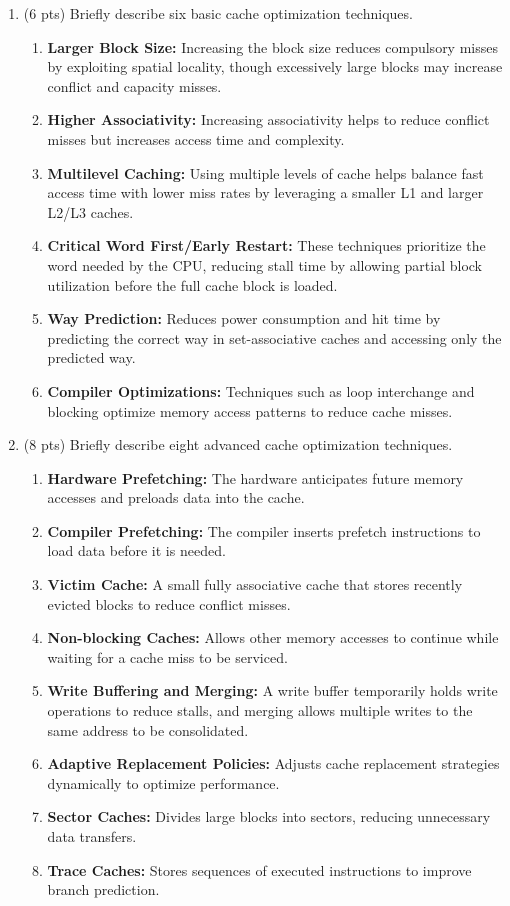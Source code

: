 \begin{enumerate}
    
    \item (6 pts) Briefly describe six basic cache optimization techniques.
    \begin{enumerate}
        \item \textbf{Larger Block Size:} Increasing the block size reduces compulsory misses by exploiting spatial locality, though excessively large blocks may increase conflict and capacity misses.
        \item \textbf{Higher Associativity:} Increasing associativity helps to reduce conflict misses but increases access time and complexity.
        \item \textbf{Multilevel Caching:} Using multiple levels of cache helps balance fast access time with lower miss rates by leveraging a smaller L1 and larger L2/L3 caches.
        \item \textbf{Critical Word First/Early Restart:} These techniques prioritize the word needed by the CPU, reducing stall time by allowing partial block utilization before the full cache block is loaded.
        \item \textbf{Way Prediction:} Reduces power consumption and hit time by predicting the correct way in set-associative caches and accessing only the predicted way.
        \item \textbf{Compiler Optimizations:} Techniques such as loop interchange and blocking optimize memory access patterns to reduce cache misses.
    \end{enumerate}
    
    \item (8 pts) Briefly describe eight advanced cache optimization techniques.
    \begin{enumerate}
        \item \textbf{Hardware Prefetching:} The hardware anticipates future memory accesses and preloads data into the cache.
        \item \textbf{Compiler Prefetching:} The compiler inserts prefetch instructions to load data before it is needed.
        \item \textbf{Victim Cache:} A small fully associative cache that stores recently evicted blocks to reduce conflict misses.
        \item \textbf{Non-blocking Caches:} Allows other memory accesses to continue while waiting for a cache miss to be serviced.
        \item \textbf{Write Buffering and Merging:} A write buffer temporarily holds write operations to reduce stalls, and merging allows multiple writes to the same address to be consolidated.
        \item \textbf{Adaptive Replacement Policies:} Adjusts cache replacement strategies dynamically to optimize performance.
        \item \textbf{Sector Caches:} Divides large blocks into sectors, reducing unnecessary data transfers.
        \item \textbf{Trace Caches:} Stores sequences of executed instructions to improve branch prediction.
    \end{enumerate}
    

\end{enumerate}
